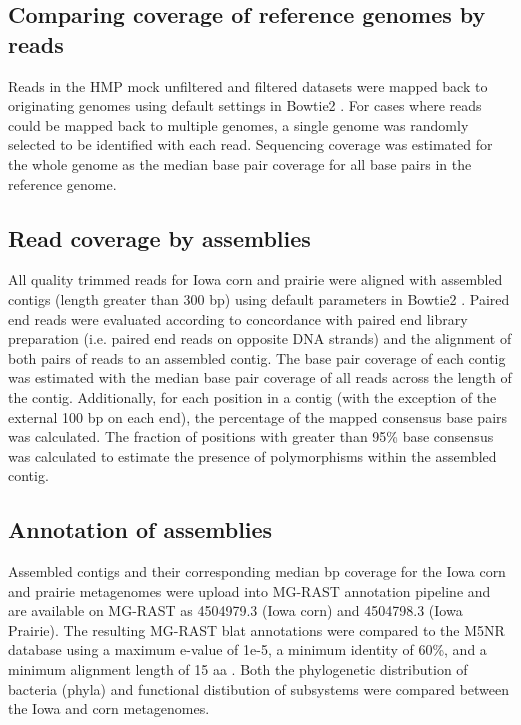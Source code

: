 \documentclass[11pt]{article} %
\begin{document}
\subsection*{Comparing coverage of reference genomes by reads}
Reads in the HMP mock unfiltered and filtered datasets were mapped
back to originating genomes using default settings in Bowtie2
\cite{bowtie}.  For cases where reads could be mapped back to multiple
genomes, a single genome was randomly selected to be identified with
each read.  Sequencing coverage was estimated for the whole genome as
the median base pair coverage for all base pairs in the reference
genome.

\subsection*{Read coverage by assemblies}
All quality trimmed reads for Iowa corn and prairie were aligned with
assembled contigs (length greater than 300 bp) using default
parameters in Bowtie2 \cite{bowtie}.  Paired end reads were evaluated according to
concordance with paired end library preparation (i.e. paired end reads
on opposite DNA strands) and the alignment of both pairs of reads to
an assembled contig.  The base pair coverage of each contig was
estimated with the median base pair coverage of all reads across the
length of the contig.  Additionally, for each position in a contig
(with the exception of the external 100 bp on each end), the
percentage of the mapped consensus base pairs was calculated.  The
fraction of positions with greater than 95\% base consensus was
calculated to estimate the presence of polymorphisms within the
assembled contig.

\subsection*{Annotation of assemblies}
Assembled contigs and their corresponding median bp coverage for the
Iowa corn and prairie metagenomes were upload into MG-RAST annotation
pipeline \cite{Meyer:2008db} and are available on MG-RAST as 4504979.3 (Iowa corn)
and 4504798.3 (Iowa Prairie).  The resulting MG-RAST blat annotations
were compared to the M5NR database using a maximum e-value of 1e-5, a
minimum identity of 60\%, and a minimum alignment length of 15 aa .
Both the phylogenetic distribution of bacteria (phyla) and functional
distibution of subsystems were compared between the Iowa and corn
metagenomes.
  
\end{document}
